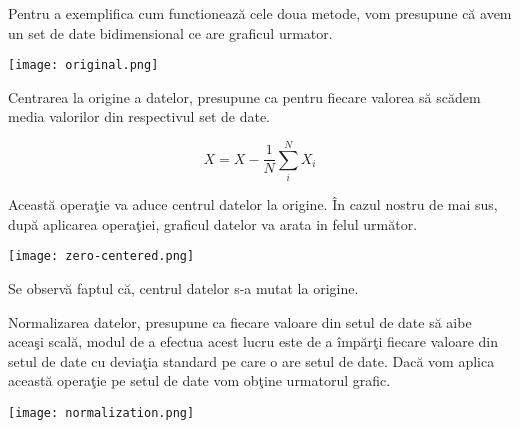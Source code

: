Pentru a exemplifica cum functioneaz\u{a} cele doua metode, vom presupune c\u{a} avem un set de date bidimensional ce are graficul urmator.

\begin{center}
\texttt{[image: original.png]}
\end{center}

Centrarea la origine a datelor, presupune ca pentru fiecare valorea s\u{a} sc\u{a}dem media valorilor din respectivul set de date.

            $$ X = X - \frac{1}{N}\sum_i^N X_i$$
            
Aceast\u{a} opera\c{t}ie va aduce centrul datelor la origine. \^{I}n cazul nostru de mai sus, dup\u{a} aplicarea opera\c{t}iei, graficul datelor va arata in felul urm\u{a}tor.

\begin{center}
\texttt{[image: zero-centered.png]}
\end{center}

Se observ\u{a} faptul c\u{a}, centrul datelor s-a mutat la origine.

Normalizarea datelor, presupune ca fiecare valoare din setul de date s\u{a} aibe acea\c{s}i scal\u{a}, modul de a efectua acest lucru este de a \^{i}mp\u{a}r\c{t}i fiecare valoare din setul de date cu devia\c{t}ia standard pe care o are setul de date. Dac\u{a} vom aplica aceast\u{a} opera\c{t}ie pe setul de date vom ob\c{t}ine urmatorul grafic.

\begin{center}
\texttt{[image: normalization.png]}
\end{center}